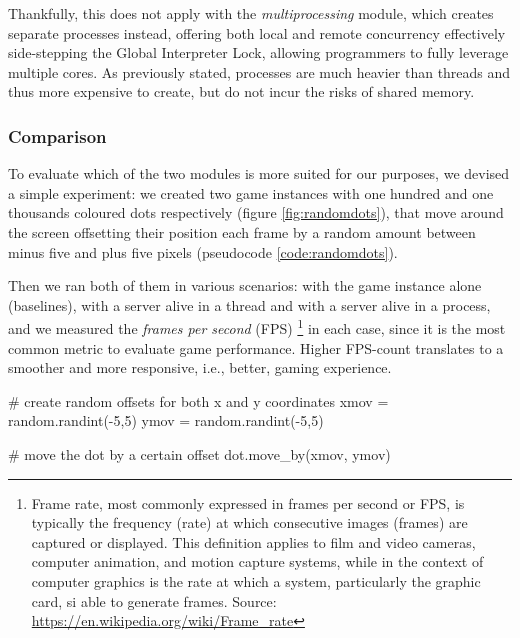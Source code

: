 Thankfully, this does not apply with the \textit{multiprocessing} module, which creates separate processes instead, offering both local and remote concurrency effectively side-stepping the Global Interpreter Lock, allowing programmers to fully leverage multiple cores. As previously stated, processes are much heavier than threads and thus more expensive to create, but do not incur the risks of shared memory. 

\subsubsection{Comparison}

To evaluate which of the two modules is more suited for our purposes, we devised a simple experiment: we created two game instances with one hundred and one thousands coloured dots respectively (figure \ref{fig:randomdots}), that move around the screen offsetting their position each frame by a random amount between minus five and plus five pixels (pseudocode \ref{code:randomdots}).

Then we ran both of them in various scenarios: with the game instance alone (baselines), with a server alive in a thread and with a server alive in a process, and we measured the \textit{frames per second} (FPS) \footnote{Frame rate, most commonly expressed in frames per second or FPS, is typically the frequency (rate) at which consecutive images (frames) are captured or displayed. This definition applies to film and video cameras, computer animation, and motion capture systems, while in the context of computer graphics is the rate at which a system, particularly the graphic card, si able to generate frames. Source: \url{https://en.wikipedia.org/wiki/Frame_rate}} in each case, since it is the most common metric to evaluate game performance. Higher FPS-count translates to a smoother and more responsive, i.e., better, gaming experience.

\begin{python}[label={code:randomdots}, caption={Pygame graphical dot}]
# create random offsets for both x and y coordinates
xmov = random.randint(-5,5)
ymov = random.randint(-5,5)

# move the dot by a certain offset
dot.move_by(xmov, ymov)
\end{python}

